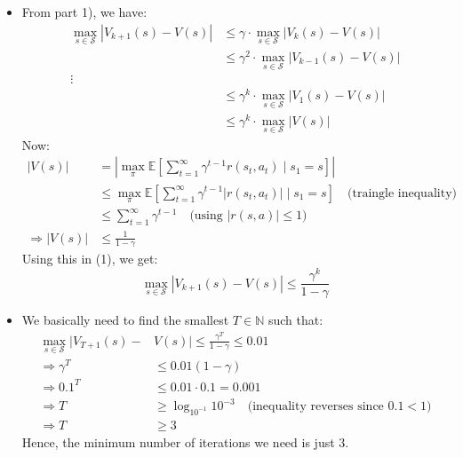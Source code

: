 \documentclass{article}
\begin{document}
\begin{itemize}
\begin{itemize}
      \item[2)] From part 1), we have:
      \begin{align*}
        \max_{s \in \mathcal{S}} |V_{k+1}(s) - V(s)| &\le \gamma \cdot \max_{s \in \mathcal{S}} |V_k(s) - V(s)| \\
        &\le \gamma^2 \cdot \max_{s \in \mathcal{S}} |V_{k-1}(s) - V(s)| \\
        \vdots \\
        &\le \gamma^{k} \cdot \max_{s \in \mathcal{S}} |V_1(s) - V(s)| \\
        &\le \gamma^{k} \cdot \max_{s \in \mathcal{S}} |V(s)| \tag{1}
      \end{align*}
      Now:
      \begin{align*}
        |V(s)| &= \left| \max_\pi \mathbb{E}\left[ \sum_{t=1}^{\infty} \gamma^{t-1} r(s_t, a_t) \mid s_1 = s \right] \right| \\
        &\le \max_\pi \mathbb{E}\left[ \sum_{t=1}^{\infty} \gamma^{t-1} |r(s_t, a_t)| \mid s_1 = s \right] \quad \text{(traingle inequality)} \\
        &\le \sum_{t=1}^{\infty} \gamma^{t-1} \quad \text{(using $|r(s, a)| \le 1$)} \\
        \Rightarrow |V(s)| &\le \frac{1}{1 - \gamma}
      \end{align*}
      Using this in (1), we get:
      \[ \max_{s \in \mathcal{S}} |V_{k+1}(s) - V(s)| \le \frac{\gamma^{k}}{1 - \gamma} \]

      \item[3)] We basically need to find the smallest $T \in \mathbb{N}$ such that:
      \begin{align*}
        \max_{s \in \mathcal{S}} |V_{T+1}(s) - &V(s)| \le \frac{\gamma^T}{1 - \gamma} \le 0.01 \\
        \Rightarrow \gamma^T &\le 0.01 (1 - \gamma) \\
        \Rightarrow 0.1^T &\le 0.01 \cdot 0.1 = 0.001 \\
        \Rightarrow T &\ge \log_{10^{-1}} 10^{-3} \quad \text{(inequality reverses since $0.1 < 1$)} \\
        \Rightarrow T &\ge 3
      \end{align*}
      Hence, the minimum number of iterations we need is just 3.
    \end{itemize}
  \end{itemize}
\end{document}
